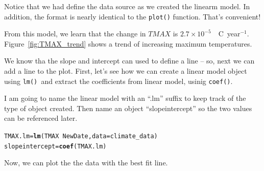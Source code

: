 \documentclass{article}\usepackage[]{graphicx}\usepackage[]{color}
\makeatletter
\newcommand{\hlopt}[1]{\textcolor[rgb]{0,0,0}{#1}}%
\newcommand{\hlstd}[1]{\textcolor[rgb]{0.345,0.345,0.345}{#1}}%
\newcommand{\hlkwb}[1]{\textcolor[rgb]{0.69,0.353,0.396}{#1}}%
\newcommand{\hlkwc}[1]{\textcolor[rgb]{0.333,0.667,0.333}{#1}}%
\newcommand{\hlkwd}[1]{\textcolor[rgb]{0.737,0.353,0.396}{\textbf{#1}}}%
\newenvironment{kframe}{%
 \def\at@end@of@kframe{}%
 \ifinner\ifhmode%
  \def\at@end@of@kframe{\end{minipage}}%
  \begin{minipage}{\columnwidth}%
 \fi\fi%
 \def\FrameCommand##1{\hskip\@totalleftmargin \hskip-\fboxsep
 \colorbox{shadecolor}{##1}\hskip-\fboxsep
     \hskip-\linewidth \hskip-\@totalleftmargin \hskip\columnwidth}%
 \MakeFramed {\advance\hsize-\width
   \@totalleftmargin\z@ \linewidth\hsize
   \@setminipage}}%
 {\par\unskip\endMakeFramed%
 \at@end@of@kframe}
\newenvironment{knitrout}{}{} %
\makeatother
\begin{document}
\noindent Notice that we had define the data source as we created the linearm model. In addition, the format is nearly identical to the \texttt{plot()} function. That's convenient!

From this model, we learn that the change in $TMAX$ is 
\ensuremath{2.7\times 10^{-5}}~\degree~C~year$^{-1}$. Figure~\ref{fig:TMAX_trend} shows a trend of increasing maximum temperatures.

We know tha the slope and intercept can used to define a line -- so, next we can add a line to the plot. First, let's see how we can create a linear model object using \texttt{lm() }and extract the coefficients from linear model, usinig \texttt{coef()}.

I am going to name the linear model with an ``.lm'' suffix to keep track of the type of object created. Then name an object ``slopeintercept'' so the two values can be referenced later. 

\begin{knitrout}
\color{fgcolor}\begin{kframe}
\begin{alltt}
\hlstd{TMAX.lm} \hlkwb{=} \hlkwd{lm}\hlstd{(TMAX} \hlopt{~} \hlstd{NewDate,} \hlkwc{data}\hlstd{= climate_data)}
\hlstd{slopeintercept} \hlkwb{=} \hlkwd{coef}\hlstd{(TMAX.lm)}
\end{alltt}
\end{kframe}
\end{knitrout}

\noindent Now, we can plot the the data with the best fit line. 
\end{document}
